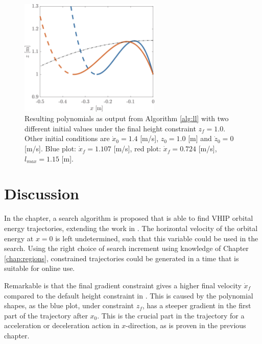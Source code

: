 \begin{figure}[h]
\centering
\includegraphics[width=0.6\textwidth]{STYLESTUFF/polynomialLengthViz.png}
\caption{Resulting polynomials as output from Algorithm \ref{alg:ll} with two different initial values under the final height constraint $z_f=1.0$. Other initial conditions are $\dot{x}_0=1.4$ [m/s], $z_0=1.0$ [m] and $\dot{z}_0=0$ [m/s]. Blue plot: $\dot{x}_f=1.107$ [m/s], red plot: $\dot{x}_f=0.724$ [m/s], $l_{max}=1.15$ [m]. }
\label{fig:pollength}
\end{figure}
\section{Discussion}
In the chapter, a search algorithm is proposed that is able to find \ac{VHIP} orbital energy trajectories, extending the work in \cite{koolen2016balance}. The horizontal velocity of the orbital energy at $x=0$ is left undetermined, such that this variable could be used in the search. Using the right choice of search increment using knowledge of Chapter \ref{chap:regions}, constrained trajectories could be generated in a time that is suitable for online use. 

Remarkable is that the final gradient constraint gives a higher final velocity $\dot{x}_f$ compared to the default height constraint in . This is caused by the polynomial shapes, as the blue plot, under constraint $z_f$, has a steeper gradient in the first part of the trajectory after $x_0$. This is the crucial part in the trajectory for a acceleration or deceleration action in $x$-direction, as is proven in the previous chapter.

